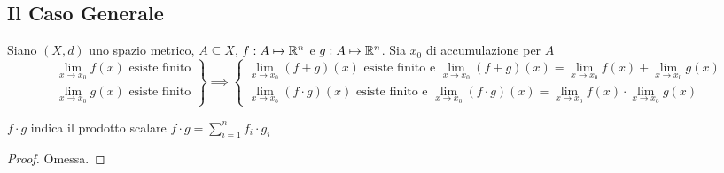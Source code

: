 \subsection{Il Caso Generale}
\begin{proposition}
	\label{prop:lim_in_R_somma_prod}
	Siano $(X,d)$ uno spazio metrico, $A \subseteq X$, $f:A \mapsto \mathbb{R}^n$ e $g:A \mapsto \mathbb{R}^n$. Sia $x_0$ di accumulazione per $A$
	\begin{equation*}
		\left.
		\begin{array}{r}
			\lim\limits_{x \to x_0} f(x) \text{ esiste finito}\\
			\lim\limits_{x \to x_0} g(x) \text{ esiste finito}
		\end{array}
		\right\}
		\implies
		\left\{
		\begin{array}{l}
			\lim\limits_{x \to x_0} (f + g)(x) \text{ esiste finito e } \lim\limits_{x \to x_0} (f + g)(x) = \lim\limits_{x \to x_0} f(x) + \lim\limits_{x \to x_0} g(x)\\
			\lim\limits_{x \to x_0} (f \cdot g)(x) \text{ esiste finito e } \lim\limits_{x \to x_0} (f \cdot g)(x) = \lim\limits_{x \to x_0} f(x) \cdot \lim\limits_{x \to x_0} g(x)
		\end{array}
		\right.
	\end{equation*}
	\begin{note}
		$f \cdot g$ indica il prodotto scalare $f \cdot g = \sum\limits_{i = 1}^{n} f_i \cdot g_i$
	\end{note}
	\begin{proof}
		Omessa.
	\end{proof}
\end{proposition}
